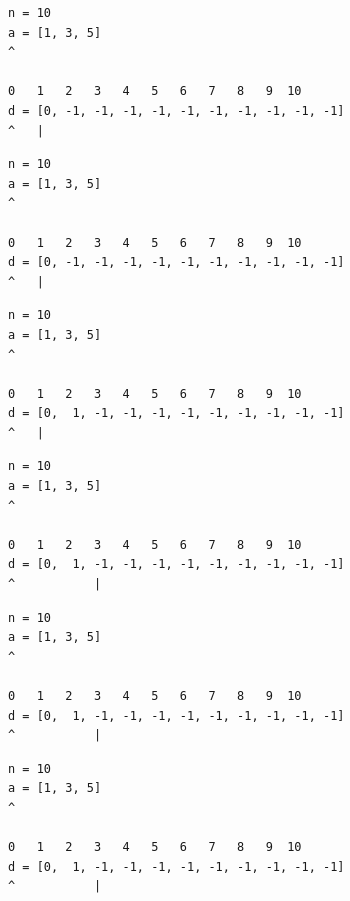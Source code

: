 \begin{frame}[fragile]
\begin{verbatim}
n = 10
a = [1, 3, 5]
^

0   1   2   3   4   5   6   7   8   9  10
d = [0, -1, -1, -1, -1, -1, -1, -1, -1, -1, -1]
^   |
\end{verbatim}
\end{frame}
\addtocounter{framenumber}{-1}

\begin{frame}[fragile]
\begin{verbatim}
n = 10
a = [1, 3, 5]
^

0   1   2   3   4   5   6   7   8   9  10
d = [0, -1, -1, -1, -1, -1, -1, -1, -1, -1, -1]
^   |
\end{verbatim}
\end{frame}
\addtocounter{framenumber}{-1}

\begin{frame}[fragile]
\begin{verbatim}
n = 10
a = [1, 3, 5]
^

0   1   2   3   4   5   6   7   8   9  10
d = [0,  1, -1, -1, -1, -1, -1, -1, -1, -1, -1]
^   |
\end{verbatim}
\end{frame}
\addtocounter{framenumber}{-1}

\begin{frame}[fragile]
\begin{verbatim}
n = 10
a = [1, 3, 5]
^

0   1   2   3   4   5   6   7   8   9  10
d = [0,  1, -1, -1, -1, -1, -1, -1, -1, -1, -1]
^           |
\end{verbatim}
\end{frame}
\addtocounter{framenumber}{-1}

\begin{frame}[fragile]
\begin{verbatim}
n = 10
a = [1, 3, 5]
^

0   1   2   3   4   5   6   7   8   9  10
d = [0,  1, -1, -1, -1, -1, -1, -1, -1, -1, -1]
^           |
\end{verbatim}
\end{frame}
\addtocounter{framenumber}{-1}

\begin{frame}[fragile]
\begin{verbatim}
n = 10
a = [1, 3, 5]
^

0   1   2   3   4   5   6   7   8   9  10
d = [0,  1, -1, -1, -1, -1, -1, -1, -1, -1, -1]
^           |
\end{verbatim}
\end{frame}
\addtocounter{framenumber}{-1}

